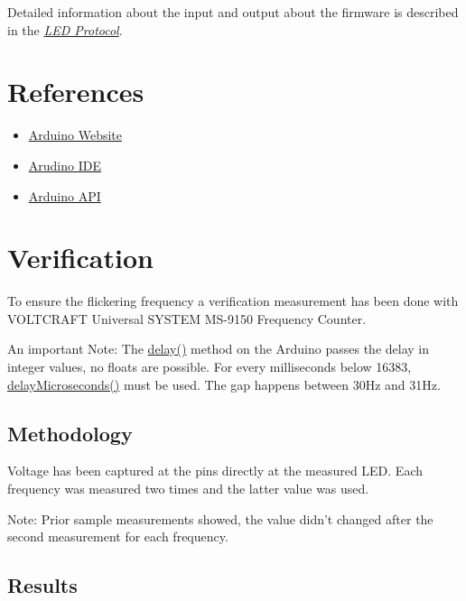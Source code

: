 Detailed information about the input and output about the firmware is described in the {\hyperref[appendix/led-protocol::doc]{\emph{\emph{LED Protocol}}}}.


\section{References}
\label{source/firmware:references}\begin{itemize}
\item {}
\href{http://www.arduino.cc/}{Arduino Website}

\item {}
\href{http://www.arduino.cc/en/Main/Software}{Arudino IDE}

\item {}
\href{http://www.arduino.cc/en/Reference/HomePage}{Arduino API}

\end{itemize}


\section{Verification}
\label{source/firmware:arduino-api}\label{source/firmware:verification}
To ensure the flickering frequency a verification measurement has been done with VOLTCRAFT Universal SYSTEM MS-9150 Frequency Counter.

An important Note: The \href{http://www.arduino.cc/en/Reference/Delay}{delay()} method on the Arduino passes the delay in integer values, no floats are possible. For every milliseconds below 16383, \href{http://www.arduino.cc/en/Reference/DelayMicroseconds}{delayMicroseconds()} must be used. The gap happens between 30Hz and 31Hz.


\subsection{Methodology}
\label{source/firmware:methodology}\label{source/firmware:delaymicroseconds}
Voltage has been captured at the pins directly at the measured LED. Each frequency was measured two times and the latter value was used.

Note: Prior sample measurements showed, the value didn't changed after the second measurement for each frequency.

\subsection{Results}
\label{source/firmware:results}

